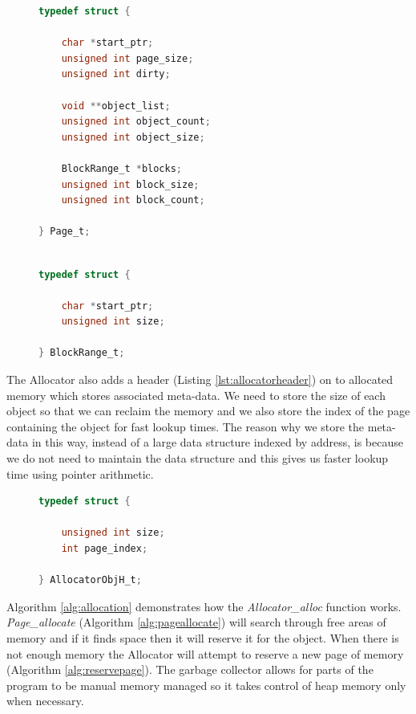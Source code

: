 \documentclass[../diss.tex]{subfiles}
\begin{document}
\begin{figure}
\begin{lstlisting}[language=C, caption=Page\_t structure with comments removed, label={lst:pagestruct}]
typedef struct {

    char *start_ptr;
    unsigned int page_size;
    unsigned int dirty;

    void **object_list;
    unsigned int object_count;
    unsigned int object_size;

    BlockRange_t *blocks;
    unsigned int block_size;
    unsigned int block_count;

} Page_t;

\end{lstlisting}
\end{figure}

\begin{figure}
\begin{lstlisting}[language=C, caption=BlockRange\_t structure with comments removed, label={lst:blockrange}]

typedef struct {

    char *start_ptr;
    unsigned int size;

} BlockRange_t;

\end{lstlisting}
\end{figure}

The Allocator also adds a header (Listing \ref{lst:allocatorheader}) on to allocated memory which stores associated meta-data. We need to store the size of each object so that we can reclaim the memory and we also store the index of the page containing the object for fast lookup times. The reason why we store the meta-data in this way, instead of a large data structure indexed by address, is because we do not need to maintain the data structure and this gives us faster lookup time using pointer arithmetic.

\begin{figure}
\begin{lstlisting}[language=C, caption=AllocatorObjH\_t structure with comments removed, label={lst:allocatorheader}]
typedef struct {

    unsigned int size;
    int page_index;

} AllocatorObjH_t;

\end{lstlisting}
\end{figure}

Algorithm \ref{alg:allocation} demonstrates how the \emph{Allocator\_alloc} function works. \emph{Page\_allocate} (Algorithm \ref{alg:pageallocate}) will search through free areas of memory and if it finds space then it will reserve it for the object. When there is not enough memory the Allocator will attempt to reserve a new page of memory (Algorithm \ref{alg:reservepage}). The garbage collector allows for parts of the program to be manual memory managed so it takes control of heap memory only when necessary.
\end{document}
